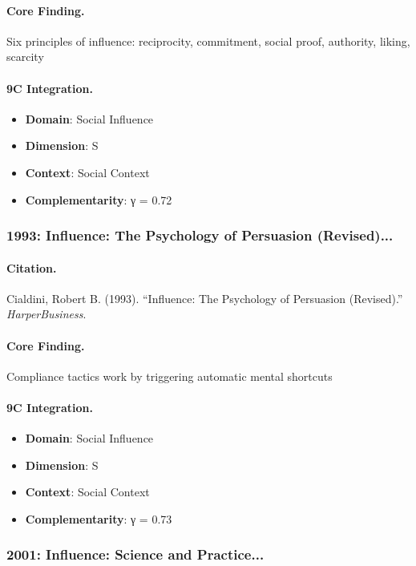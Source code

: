 \paragraph{Core Finding.}
Six principles of influence: reciprocity, commitment, social proof, authority, liking, scarcity

\paragraph{9C Integration.}
\begin{itemize}[nosep]
  \item \textbf{Domain}: Social Influence
  \item \textbf{Dimension}: S
  \item \textbf{Context}: Social Context
  \item \textbf{Complementarity}: γ = 0.72
\end{itemize}

\subsubsection{1993: Influence: The Psychology of Persuasion (Revised)...}

\paragraph{Citation.}
Cialdini, Robert B. (1993). ``Influence: The Psychology of Persuasion (Revised).''
\textit{HarperBusiness}.

\paragraph{Core Finding.}
Compliance tactics work by triggering automatic mental shortcuts

\paragraph{9C Integration.}
\begin{itemize}[nosep]
  \item \textbf{Domain}: Social Influence
  \item \textbf{Dimension}: S
  \item \textbf{Context}: Social Context
  \item \textbf{Complementarity}: γ = 0.73
\end{itemize}

\subsubsection{2001: Influence: Science and Practice...}

